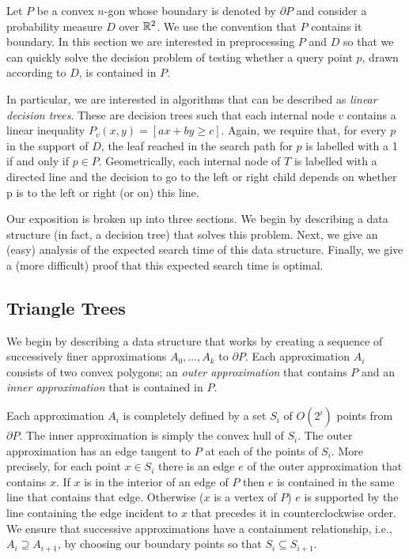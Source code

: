 \documentclass[charterfonts,lotsofwhite]{patmorin}
\newcommand{\boundary}{\partial}
\begin{document}
Let $P$ be a convex $n$-gon whose boundary is denoted by $\partial P$
and consider a probability measure $D$ over $\mathbb{R}^2$.  We use the
convention that $P$ contains it boundary.  In this section we are
interested in preprocessing $P$ and $D$ so that we can quickly solve the
decision problem of testing whether a query point $p$, drawn according
to $D$, is contained in $P$. 

In particular, we are interested in algorithms that can be described
as \emph{linear decision trees}.  These are decision trees such that
each internal node $v$ contains a linear inequality $P_v(x,y)=[ax+by
\ge c]$.  Again, we require that, for every $p$ in the support of $D$,
the leaf reached in the search path for $p$ is labelled with a 1 if
and only if $p\in P$.  Geometrically, each internal node of $T$ is
labelled with a directed line and the decision to go to the left or
right child depends on whether p is to the left or right (or on) this
line.  

Our exposition is broken up into three sections.  We begin by
describing a data structure (in fact, a decision tree) that solves
this problem.  Next, we give an (easy) analysis of the expected search
time of this data structure.  Finally, we give a (more difficult)
proof that this expected search time is optimal.


\subsection{Triangle Trees}

We begin by describing a data structure that works by creating a
sequence of successively finer approximations $A_0,\ldots,A_k$ to
$\boundary P$.  Each approximation $A_i$ consists of two convex
polygons; an \emph{outer approximation} that contains $P$ and an
\emph{inner approximation} that is contained in $P$.

Each approximation $A_i$ is completely defined by a set $S_i$ of
$O(2^i)$ points from $\boundary P$.  The inner approximation is simply
the convex hull of $S_i$.  The outer approximation has an edge tangent
to $P$ at each of the points of $S_i$.  More precisely, for each point
$x\in S_i$ there is an edge $e$ of the outer approximation that
contains $x$.  If $x$ is in the interior of an edge of $P$ then $e$ is
contained in the same line that contains that edge. Otherwise ($x$ is
a vertex of $P$) $e$ is supported by the line containing the edge
incident to $x$ that precedes it in counterclockwise order.  We ensure
that successive approximations have a containment relationship, i.e.,
$A_i\supseteq A_{i+1}$, by choosing our boundary points so that
$S_i\subseteq S_{i+1}$.
\end{document}
